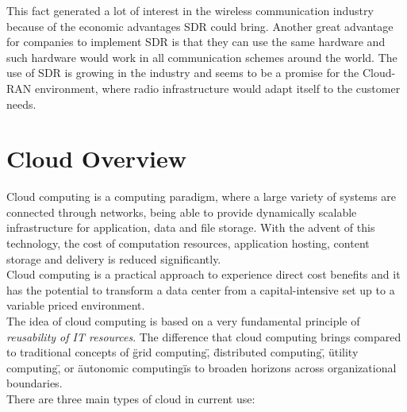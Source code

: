 This fact generated a lot of interest in the wireless communication industry
because of the economic advantages SDR could bring. Another great advantage for
companies to implement SDR is that they can use the same hardware and such
hardware would work in all communication schemes around the world. The use of
SDR is growing in the industry and seems to be a promise for the Cloud-RAN
environment, where radio infrastructure would adapt itself to the customer
needs.

\section{Cloud Overview}
\label{sec:sdr_cloud}

Cloud computing is a computing paradigm, where a large variety of systems are
connected through networks, being able to provide dynamically scalable
infrastructure for application, data and file storage. With the advent of this
technology, the cost of computation resources, application hosting, content
storage and delivery is reduced significantly. \\

Cloud computing is a practical approach to experience direct cost benefits and
it has the potential to transform a data center from a capital-intensive set up
to a variable priced environment. \\

The idea of cloud computing is based on a very fundamental principle of
\emph{reusability of IT resources}. The difference that cloud computing brings
compared to traditional concepts of \"grid computing\", \"distributed computing\",
\"utility computing\", or \"autonomic computing\" is to broaden horizons across
organizational boundaries.\\

There are three main types of cloud in current use:


